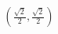 \documentclass[preview]{standalone}
\begin{document}
\begin{align*}
\left(\frac{\sqrt{2}}{2}, \frac{\sqrt{2}}{2}\right)
\end{align*}
\end{document}
